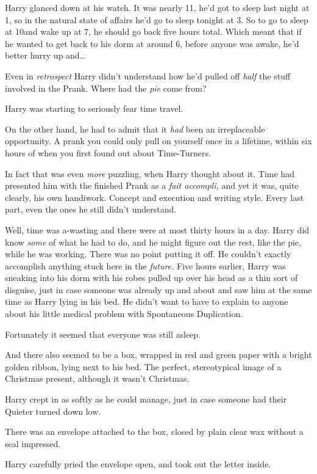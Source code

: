 Harry glanced down at his watch. It was nearly 11\AM, he'd got to sleep last
night at 1\AM, so in the natural state of affairs he'd go to sleep tonight at
3\AM. So to go to sleep at 10\PM and wake up at 7\AM, he should go back five hours
total. Which meant that if he wanted to get back to his dorm at around 6\AM,
before anyone was awake, he'd better hurry up and…

Even in \emph{retrospect} Harry didn't understand how he'd pulled off
\emph{half} the stuff involved in the Prank. Where had the \emph{pie} come from?

Harry was starting to seriously fear time travel.

On the other hand, he had to admit that it \emph{had} been an irreplaceable
opportunity. A prank you could only pull on yourself once in a lifetime, within
six hours of when you first found out about Time-Turners.

In fact that was even \emph{more} puzzling, when Harry thought about it. Time
had presented him with the finished Prank as a \emph{fait accompli,} and yet it
was, quite clearly, his own handiwork. Concept and execution and writing style.
Every last part, even the ones he still didn't understand.

Well, time was a-wasting and there were at most thirty hours in a day. Harry
did know \emph{some} of what he had to do, and he might figure out the rest,
like the pie, while he was working. There was no point putting it off. He
couldn't exactly accomplish anything stuck here in the \emph{future.}
\later
Five hours earlier, Harry was sneaking into his dorm with his robes pulled up
over his head as a thin sort of disguise, just in case someone was already up
and about and saw him at the same time as Harry lying in his bed. He didn't
want to have to explain to anyone about his little medical problem with
Spontaneous Duplication.

Fortunately it seemed that everyone was still asleep.

And there also seemed to be a box, wrapped in red and green paper with a bright
golden ribbon, lying next to his bed. The perfect, stereotypical image of a
Christmas present, although it wasn't Christmas.

Harry crept in as softly as he could manage, just in case someone had their
Quieter turned down low.

There was an envelope attached to the box, closed by plain clear wax without a
seal impressed.

Harry carefully pried the envelope open, and took out the letter inside.

